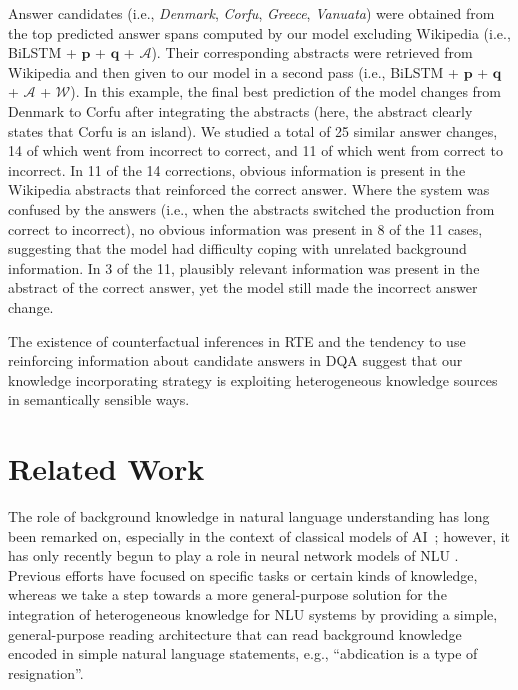 \documentclass[11pt,a4paper]{article}
\begin{document}
\noindent Answer candidates (i.e., \textit{Denmark}, \textit{Corfu}, \textit{Greece}, \textit{Vanuata}) were obtained from the top predicted answer spans computed by our model excluding Wikipedia (i.e., BiLSTM + $\boldsymbol{p}$ + $\boldsymbol{q}$ + $\mathcal{A}$). Their corresponding abstracts were retrieved from Wikipedia and then given to our model in a second pass (i.e., BiLSTM + $\boldsymbol{p}$ + $\boldsymbol{q}$ + $\mathcal{A}$ + $\mathcal{W}$). In this example, the final best prediction of the model changes from Denmark to Corfu after integrating the abstracts (here, the abstract clearly states that Corfu is an island). We studied a total of 25 similar answer changes, 14 of which went from incorrect to correct, and 11 of which went from correct to incorrect. In 11 of the 14 corrections, obvious information is present in the Wikipedia abstracts that reinforced the correct answer. Where the system was confused by the answers (i.e., when the abstracts switched the production from correct to incorrect), no obvious information was present in 8 of the 11 cases, suggesting that the model had difficulty coping with unrelated background information. In 3 of the 11, plausibly relevant information was present in the abstract of the correct answer, yet the model still made the incorrect answer change.

The existence of counterfactual inferences in RTE and the tendency to use reinforcing information about candidate answers in DQA suggest that our knowledge incorporating strategy is exploiting heterogeneous knowledge sources in semantically sensible ways.

\section{Related Work}
The role of background knowledge in natural language understanding has long been remarked on, especially in the context of classical models of AI~\citep{schank:1977,minsky2000commonsense}; however, it has only recently begun to play a role in neural network models of NLU \citep{ahn2016neural,Xu2016,long2017world,Dhingra2017}. Previous efforts have focused on specific tasks or certain kinds of knowledge, whereas we take a step towards a more general-purpose solution for the integration of heterogeneous knowledge for NLU systems by providing a simple, general-purpose reading architecture that can read background knowledge encoded in simple natural language statements, e.g., ``abdication is a type of resignation''.
\end{document}
